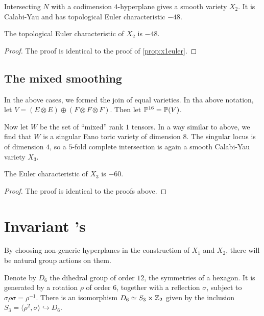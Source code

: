 Intersecting $N$ with a codimension $4$-hyperplane gives a smooth variety $X_2$. It is Calabi-Yau and has topological Euler characteristic $-48$.

\begin{proposition}
The topological Euler characteristic of $X_2$ is $-48$.
\end{proposition}
\begin{proof}
The proof is identical to the proof of \cref{prop:x1euler}.
\end{proof}

\subsection{The mixed smoothing}

In the above cases, we formed the join of equal varieties. In tha above notation, let $V=(E \otimes E) \oplus (F \otimes F \otimes F)$. Then let $\P^{16}=\P(V)$.

Now let $W$ be the set of ``mixed'' rank $1$ tensors. In a way similar to above, we find that $W$ is a singular Fano toric variety of dimension $8$. The singular locus is of dimension $4$, so a $5$-fold complete intersection is again a smooth Calabi-Yau variety $X_3$.

\begin{proposition}
The Euler characteristic of $X_3$ is $-60$.
\end{proposition}
\begin{proof}
The proof is identical to the proofs above.
\end{proof}


\section{Invariant \CY's}

By choosing non-generic hyperplanes in the construction of $X_1$ and $X_2$, there will be natural group actions on them.

Denote by $D_6$ the dihedral group of order $12$, the symmetries of a hexagon. It is generated by a rotation $\rho$ of order $6$, together with a reflection $\sigma$, subject to $\sigma \rho \sigma = \rho^{-1}$. There is an isomorphism $D_6 \simeq S_3 \times \Z_2$ given by the inclusion $S_3 = \langle \rho^2, \sigma \rangle \hookrightarrow D_6$. 

